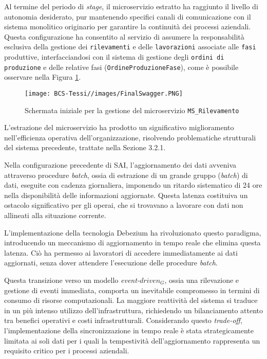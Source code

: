         \vspace{0.2 em}
        \noindent Al termine del periodo di \textit{stage}, il microservizio estratto ha raggiunto il livello di autonomia desiderato, pur mantenendo specifici canali di comunicazione con il sistema monolitico originario per garantire la continuità dei processi aziendali. Questa configurazione ha consentito al servizio di assumere la responsabilità esclusiva della gestione dei \texttt{rilevamenti} e delle \texttt{lavorazioni} associate alle \texttt{fasi} produttive, interfacciandosi con il sistema di gestione degli \texttt{ordini di produzione} e delle relative fasi (\texttt{OrdineProduzioneFase}), come è possibile osservare nella Figura \ref{fig:final-Swagger}.
        
        \begin{figure}[H]
            \centering
            \texttt{[image: BCS-Tessi//images/FinalSwagger.PNG]}
            \caption{Schermata iniziale per la gestione del microservizio \texttt{MS\_Rilevamento}}
            \label{fig:final-Swagger}
        \end{figure}

        \vspace{0.2 em}
        \noindent L'estrazione del microservizio ha prodotto un significativo miglioramento nell'efficienza operativa dell'organizzazione, risolvendo problematiche strutturali del sistema precedente, trattate nella Sezione 3.2.1. 

        \vspace{0.2 em}
        \noindent Nella configurazione precedente di SAI, l'aggiornamento dei dati avveniva attraverso procedure \textit{batch}, ossia di estrazione di un grande gruppo (\textit{batch}) di dati, eseguite con cadenza giornaliera, imponendo un ritardo sistematico di 24 ore nella disponibilità delle informazioni aggiornate. Questa latenza costituiva un ostacolo significativo per gli operai, che si trovavano a lavorare con dati non allineati alla situazione corrente.

        \vspace{0.2 em}
        \noindent L'implementazione della tecnologia Debezium ha rivoluzionato questo paradigma, introducendo un meccanismo di aggiornamento in tempo reale che elimina questa latenza. Ciò ha permesso ai lavoratori di accedere immediatamente ai dati aggiornati, senza dover attendere l'esecuzione delle procedure \textit{batch}.

        \vspace{0.2 em}
        \noindent Questa transizione verso un modello \textit{event-$driven_G$}, ossia una rilevazione e gestione di eventi immediata, comporta un inevitabile compromesso in termini di consumo di risorse computazionali. La maggiore reattività del sistema si traduce in un più intenso utilizzo dell'infrastruttura, richiedendo un bilanciamento attento tra benefici operativi e costi infrastrutturali. Considerando questo \textit{trade-off}, l'implementazione della sincronizzazione in tempo reale è stata strategicamente limitata ai soli dati per i quali la tempestività dell'aggiornamento rappresenta un requisito critico per i processi aziendali.

